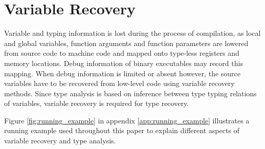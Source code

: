 
\section{Variable Recovery}

Variable and typing information is lost during the process of compilation, as local and global variables, function arguments and function parameters are lowered from source code to machine code and mapped onto type-less registers and memory locations. Debug information of binary executables may record this mapping. When debug information is limited or absent however, the source variables have to be recovered from low-level code using variable recovery methods. Since type analysis is based on inference between type typing relations of variables, variable recovery is required for type recovery.

Figure \ref{fig:running_example} in appendix \ref{app:running_example} illustrates a running example used throughout this paper to explain different aspects of variable recovery and type analysis.




